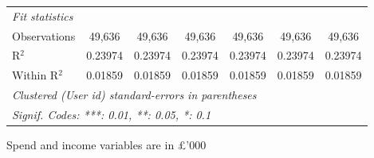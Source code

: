\begin{table}[htbp]
\begin{threeparttable}[b]
\begin{tabular}{lcccccc}
         \midrule
         \emph{Fit statistics}\\
         Observations        & 49,636        & 49,636        & 49,636        & 49,636        & 49,636        & 49,636\\  
         R$^2$               & 0.23974       & 0.23974       & 0.23974       & 0.23974       & 0.23974       & 0.23974\\  
         Within R$^2$        & 0.01859       & 0.01859       & 0.01859       & 0.01859       & 0.01859       & 0.01859\\  
         \midrule \midrule
         \multicolumn{7}{l}{\emph{Clustered (User id) standard-errors in parentheses}}\\
         \multicolumn{7}{l}{\emph{Signif. Codes: ***: 0.01, **: 0.05, *: 0.1}}\\
      \end{tabular}
      
      \begin{tablenotes}\footnotesize
         \item Spend and income variables are in £'000
      \end{tablenotes}
   \end{threeparttable}
\end{table}


